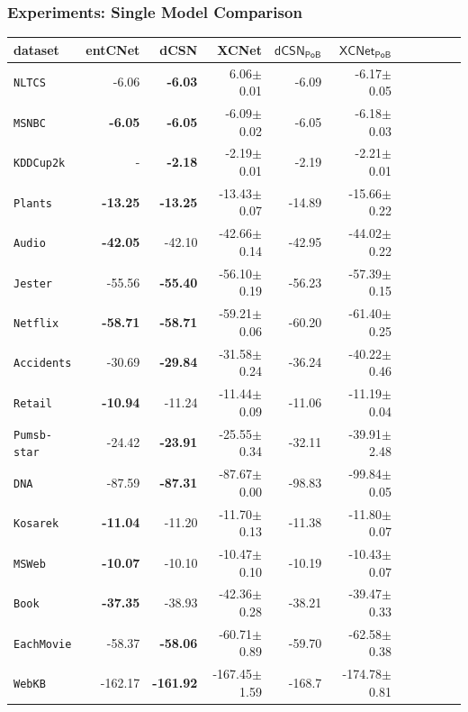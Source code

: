 \documentclass[xcolor={usenames,dvipsnames,svgnames}, compress]{beamer}
\begin{document}
\begin{frame}[t]
  \frametitle{Experiments: Single Model Comparison}
      \begin{table}[t]
  \tiny
  \centering
  \setlength{\tabcolsep}{3pt}  
  \begin{tabular}{l rrrrrrrrrr}
    dataset & \tiny\textsf{entCNet} & \tiny\textsf{dCSN} & \tiny\textsf{XCNet} & \tiny$\mathsf{dCSN_{PoB}}$ & \tiny$\mathsf{XCNet_{PoB}}$\\
    \midrule
    \texttt{NLTCS}        &-6.06 &\textbf{-6.03}&6.06$\pm$0.01&-6.09&-6.17$\pm$0.05\\
    \texttt{MSNBC}        &\textbf{-6.05}&\textbf{-6.05}&-6.09$\pm$0.02&-6.05&-6.18$\pm$0.03\\
    \texttt{KDDCup2k}     & - &\textbf{-2.18}&-2.19$\pm$0.01&-2.19&-2.21$\pm$0.01\\
    \texttt{Plants}       &\textbf{-13.25}&\textbf{-13.25}&-13.43$\pm$0.07&-14.89&-15.66$\pm$0.22\\
    \texttt{Audio}        &\textbf{-42.05}&-42.10&-42.66$\pm$0.14&-42.95&-44.02$\pm$0.22\\
    \texttt{Jester}       &-55.56&\textbf{-55.40}&-56.10$\pm$0.19&-56.23&-57.39$\pm$0.15\\
    \texttt{Netflix}      &\textbf{-58.71}&\textbf{-58.71}&-59.21$\pm$0.06&-60.20&-61.40$\pm$0.25\\
    \texttt{Accidents}    &-30.69&\textbf{-29.84}& -31.58$\pm$0.24 &-36.24&-40.22$\pm$0.46\\
    \texttt{Retail}       &\textbf{-10.94}&-11.24&-11.44$\pm$0.09&-11.06&-11.19$\pm$0.04\\
    \texttt{Pumsb-star}   &-24.42&\textbf{-23.91}&-25.55$\pm$0.34&-32.11&-39.91$\pm$2.48\\
    \texttt{DNA}          &-87.59&\textbf{-87.31}&-87.67$\pm$0.00&-98.83&-99.84$\pm$0.05\\
    \texttt{Kosarek}      &\textbf{-11.04}&-11.20&-11.70$\pm$0.13&-11.38&-11.80$\pm$0.07\\
    \texttt{MSWeb}        &\textbf{-10.07}&-10.10&-10.47$\pm$0.10&-10.19&-10.43$\pm$0.07\\
    \texttt{Book}         &\textbf{-37.35}&-38.93&-42.36$\pm$0.28&-38.21&-39.47$\pm$0.33\\
    \texttt{EachMovie}    &-58.37&\textbf{-58.06}&-60.71$\pm$0.89&-59.70&-62.58$\pm$0.38\\
    \texttt{WebKB}        &-162.17&\textbf{-161.92}&-167.45$\pm$1.59&-168.7&-174.78$\pm$0.81\\

\end{tabular}
\end{table}
\end{frame}
\end{document}
